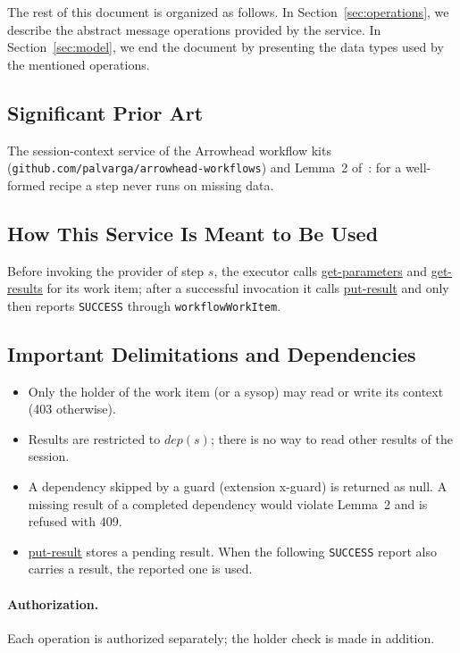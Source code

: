 \documentclass[a4paper]{arrowhead}
\newcommand{\oref}[1]{{\textcolor{ArrowheadBlue}{\hyperref[sec:operations:#1]{#1}}}}
\begin{document}
The rest of this document is organized as follows.
In Section~\ref{sec:operations}, we describe the abstract message operations provided by the service.
In Section~\ref{sec:model}, we end the document by presenting the data types used by the mentioned operations.

\subsection{Significant Prior Art}
The session-context service of the Arrowhead workflow kits (\texttt{github.\allowbreak{}com/\allowbreak{}palvarga/\allowbreak{}arrowhead-\allowbreak{}workflows})
and Lemma~2 of~\cite{varga2026}: for a well-formed recipe a step never runs on missing data.

\subsection{How This Service Is Meant to Be Used}
Before invoking the provider of step $s$, the executor calls \oref{get-parameters} and \oref{get-results}
for its work item; after a successful invocation it calls \oref{put-result} and only then reports \texttt{SUCCESS}
through \texttt{workflow\allowbreak{}Work\allowbreak{}Item}.

\subsection{Important Delimitations and Dependencies}
\label{sec:delimitations}
\begin{itemize}
\item Only the holder of the work item (or a sysop) may read or write its context (403 otherwise).
\item Results are restricted to $dep(s)$; there is no way to read other results of the session.
\item A dependency skipped by a guard (extension x-guard) is returned as null. A missing result of a completed dependency would violate Lemma~2 and is refused with 409.
\item \oref{put-result} stores a pending result. When the following \texttt{SUCCESS} report also carries a result, the reported one is used.
\end{itemize}

\paragraph{Authorization.} Each operation is authorized separately; the holder check is made in addition.
\end{document}
